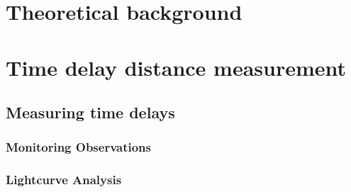 
\section{Theoretical background}
\label{sec:theory}





\section{Time delay distance measurement}
\label{sec:overview}




\subsection{Measuring time delays}
\label{sec:timedelay}



\subsubsection{Monitoring Observations}





\subsubsection{Lightcurve Analysis}

